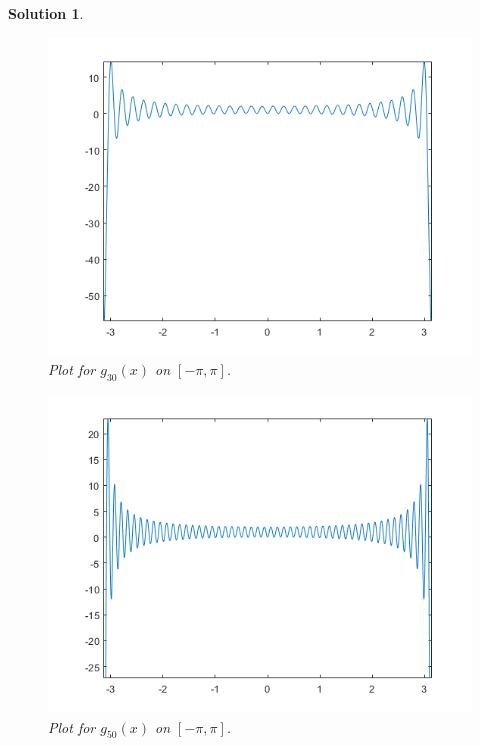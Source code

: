 \documentclass[leqno]{article}
\theoremstyle{nonumberplain}
\newtheorem{solution}{Solution}
\begin{document}
\begin{solution}
\begin{figure}[h]
    \centering
    \includegraphics{problem_3_7_hw_5.png}
    \caption{Plot for $g_{30}(x)$ on $[-\pi,\pi]$.}
    \label{fig:my_label}
\end{figure}
\pagebreak

\begin{figure}[h]
    \centering
    \includegraphics{problem_3_8_hw_5.png}
    \caption{Plot for $g_{50}(x)$ on $[-\pi,\pi]$.}
    \label{fig:my_label}
\end{figure}
\pagebreak


\end{solution}
\end{document}
